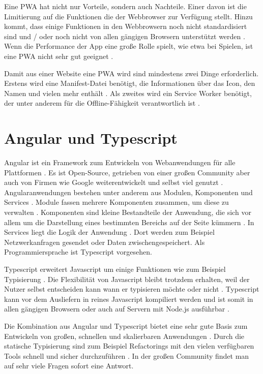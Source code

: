 Eine \ac{PWA} hat nicht nur Vorteile, sondern auch Nachteile. Einer davon ist die Limitierung auf die Funktionen die der Webbrowser zur Verfügung stellt. Hinzu kommt, dass einige Funktionen in den Webbrowsern noch nicht standardisiert sind und / oder noch nicht von allen gängigen Browsern unterstützt werden \autocite{majchrzak2018} \autocite{biorn2017}. Wenn die Performance der App eine große Rolle spielt, wie etwa bei Spielen, ist eine \ac{PWA} nicht sehr gut geeignet \autocite{biorn2017}.

Damit aus einer Website eine \ac{PWA} wird sind mindestens zwei Dinge erforderlich. Erstens wird eine Manifest-Datei benötigt, die Informationen über das Icon, den Namen und vielen mehr enthält \autocite{Hajian2019} \autocite{Rojas2020}. Als zweites wird ein Service Worker benötigt, der unter anderem für die Offline-Fähigkeit verantwortlich ist \autocite{Rojas2020}. 


\section{Angular und Typescript}
Angular ist ein Framework zum Entwickeln von Webanwendungen für alle Plattformen \autocite{angular-io}. Es ist Open-Source, getrieben von einer großen Community aber auch von Firmen wie Google weiterentwickelt und selbst viel genutzt \autocite{angular-io}. Angularanwendungen bestehen unter anderem aus Modulen, Komponenten und Services \autocite{angular-start}. Module fassen mehrere Komponenten zusammen, um diese zu verwalten \autocite{angular-start}. Komponenten sind kleine Bestandteile der Anwendung, die sich vor allem um die Darstellung eines bestimmten Bereichs auf der Seite kümmern \autocite{angular-start}. In Services liegt die Logik der Anwendung \autocite{angular-start}. Dort werden zum Beispiel Netzwerkanfragen gesendet oder Daten zwischengespeichert. Als Programmiersprache ist Typescript vorgesehen. 

Typescript erweitert Javascript um einige Funktionen wie zum Beispiel Typisierung \autocite{typescript-org}. Die Flexibilität von Javascript bleibt trotzdem erhalten, weil der Nutzer selbst entscheiden kann wann er typisieren möchte oder nicht \autocite{typescript-org}. Typescript kann vor dem Ausliefern in reines Javascript kompiliert werden und ist somit in allen gängigen Browsern oder auch auf Servern mit Node.js ausführbar \autocite{typescript-org}.

Die Kombination aus Angular und Typescript bietet eine sehr gute Basis zum Entwickeln von großen, schnellen und skalierbaren Anwendungen \autocite{angular-io}. Durch die statische Typisierung sind zum Beispiel Refactorings mit den vielen verfügbaren Tools schnell und sicher durchzuführen \autocite{typescript-org} \autocite{angular-io}. In der großen Community findet man auf sehr viele Fragen sofort eine Antwort.


